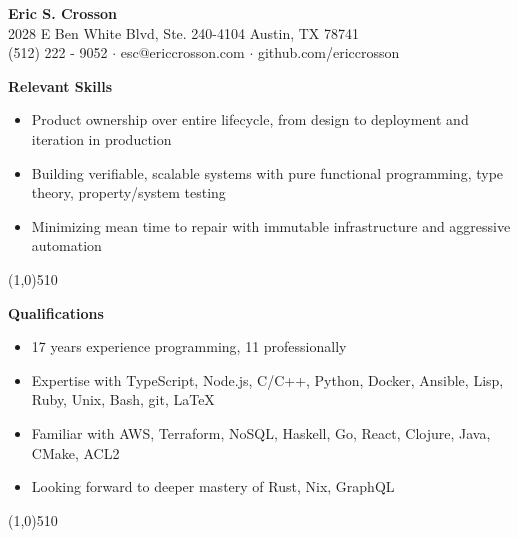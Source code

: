 \documentclass{report}
\newcommand{\cut}{\begin{center} \line(1,0){510} \end{center}}
\begin{document}
\pagestyle{empty}
\setlength\parindent{0pt}

\begin{center}
  \textbf{Eric S. Crosson} \\
  2028 E Ben White Blvd, Ste. 240-4104 Austin, TX 78741 \\
  (512) 222 - 9052 $\cdot$ esc@ericcrosson.com $\cdot$ github.com/ericcrosson
\end{center}

%

\textbf{Relevant Skills}
\begin{itemize}[label=$\cdot$]
\item Product ownership over entire lifecycle, from design to deployment and iteration in production
\item Building verifiable, scalable systems with pure functional programming, type theory, property/system testing
\item Minimizing mean time to repair with immutable infrastructure and aggressive automation
\end{itemize}

\cut{}

\textbf{Qualifications}
\begin{itemize}[label=$\cdot$]
\item 17 years experience programming, 11 professionally
\item Expertise with TypeScript, Node.js, C/C++, Python, Docker, Ansible, Lisp, Ruby, Unix, Bash, git, \LaTeX{}
\item Familiar with AWS, Terraform, NoSQL, Haskell, Go, React, Clojure, Java, CMake, ACL2
\item Looking forward to deeper mastery of Rust, Nix, GraphQL
\end{itemize}

\cut{}
\end{document}
